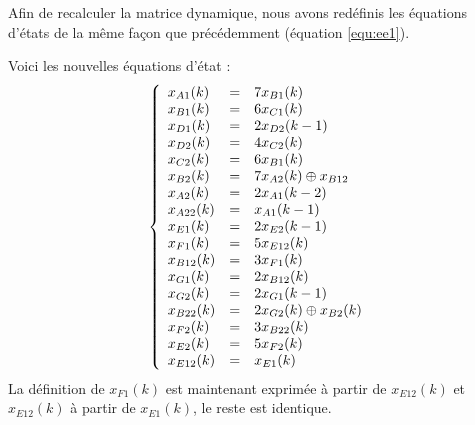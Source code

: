 Afin de recalculer la matrice dynamique, nous avons redéfinis les équations d'états de la même façon que précédemment (équation \ref{equ:ee1}). 

Voici les nouvelles équations d'état :
\begin{equation}
\label{equ:ee1}
\left\lbrace
\begin{array}{l c l}
x_{A1}(k) &=&	7x_{B1}(k)\\ 
x_{B1}(k) &=&	6x_{C1}(k)\\
x_{D1}(k) &=&	2x_{D2}(k-1)\\
x_{D2}(k) &=&	4x_{C2}(k)\\
x_{C2}(k) &=&	6x_{B1}(k)\\
x_{B2}(k) &=&	7x_{A2}(k) \oplus x_{B12}\\
x_{A2}(k) &=&	2x_{A1}(k-2)\\
x_{A22}(k) &=&	x_{A1}(k-1)\\
x_{E1}(k) &=&	2x_{E2}(k-1)\\
x_{F1}(k) &=&	5x_{E12}(k)\\
x_{B12}(k) &=&	3x_{F1}(k)\\
x_{G1}(k) &=&	2x_{B12}(k)\\
x_{G2}(k) &=&	2x_{G1}(k-1)\\
x_{B22}(k) &=&	2x_{G2}(k) \oplus x_{B2}(k)\\
x_{F2}(k) &=&	3x_{B22}(k)\\
x_{E2}(k) &=&	5x_{F2}(k)   \\  
x_{E12}(k) &=&	x_{E1}(k)   \\  
\end{array}
\right.
\end{equation}
La définition de $x_{F1}(k)$ est maintenant exprimée à partir de $x_{E12}(k)$ et $x_{E12}(k)$ à partir de $x_{E1}(k)$, le reste est identique.


